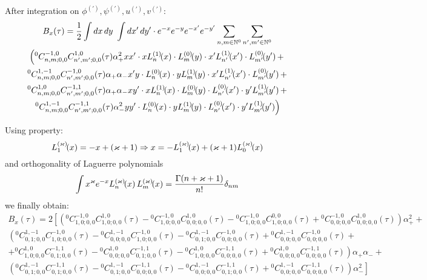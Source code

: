 \documentclass[12pt, notitlepage]{report}
\begin{document}
After integration on $\phi^{(')}, \psi^{(')}, u^{(')}, v^{(')}$:
\begin{multline}
	B_x(\tau) = \frac{1}{2} \int dx\, dy\ \int dx'\, dy' \cdot e^{-x}e^{-y}e^{-x'}e^{-y'}\sum\limits_{n,m\in \mathbb{N}^0}\sum\limits_{n',m'\in \mathbb{N}^0} \\
	\left( {}^0C^{-1, 0}_{n,m; 0, 0} C^{1, 0}_{n',m'; 0,0}(\tau)\alpha_+^2 xx' \cdot x\Lagg{n}{1}{x} \cdot \Lagg{m}{0}{y}\cdot x'\Lagg{n'}{1}{x'} \cdot \Lagg{m'}{0}{y'} + \right.\\
	\left. {}^0C^{1, -1}_{n,m; 0, 0} C^{-1, 0}_{n',m'; 0,0}(\tau)\alpha_+\alpha_- x'y \cdot \Lagg{n}{0}{x} \cdot y\Lagg{m}{1}{y}\cdot x'\Lagg{n'}{1}{x'} \cdot \Lagg{m'}{0}{y'} + \right.\\
	\left.  {}^0C^{1, 0}_{n,m; 0, 0} C^{-1, 1}_{n',m'; 0,0}(\tau)\alpha_+\alpha_- xy' \cdot x\Lagg{n}{1}{x} \cdot \Lagg{m}{0}{y}\cdot \Lagg{n'}{0}{x'} \cdot y'\Lagg{m'}{1}{y'} + \right.\\
	\left. {}^0C^{1, -1}_{n,m; 0, 0} C^{-1, 1}_{n',m'; 0,0}(\tau)\alpha_-^2 yy' \cdot \Lagg{n}{0}{x} \cdot y\Lagg{m}{1}{y}\cdot \Lagg{n'}{0}{x'} \cdot y'\Lagg{m'}{1}{y'} \right)
\end{multline}

Using property:
$$
L_{1}^{(\varkappa)}\!\!\left(x\right) = -x + (\varkappa+1) \Rightarrow x = -L_{1}^{(\varkappa)}\!\!\left(x\right) + (\varkappa+1)L_{0}^{(\varkappa)}\!\!\left(x\right)
$$
and orthogonality of Laguerre polynomials
$$
\int x^\varkappa e^{-x} L_{n}^{(\varkappa)}\!\!\left(x\right)L_{m}^{(\varkappa)}\!\!\left(x\right) = \frac{\Gamma(n+\varkappa+1)}{n!}\delta_{nm}
$$
we finally obtain:
\begin{multline}
	B_x(\tau) = 2 \left[ \left( {}^0C^{-1, 0}_{1,0; 0, 0} C^{1, 0}_{1,0; 0,0}(\tau) - {}^0C^{-1, 0}_{1,0; 0, 0} C^{1, 0}_{0,0; 0,0}(\tau) - {}^0C^{-1, 0}_{1,0; 0, 0} C^{0, 0}_{1,0; 0,0}(\tau) + {}^0C^{-1, 0}_{0,0; 0, 0} C^{1, 0}_{0,0; 0,0}(\tau) \right)\alpha_+^2  + \right.\\
	\left. \left( {}^0C^{1, -1}_{0,1; 0, 0} C^{-1, 0}_{1,0; 0,0}(\tau) - {}^0C^{1, -1}_{0,0; 0, 0} C^{-1, 0}_{1,0; 0,0}(\tau) - {}^0C^{1, -1}_{0,1; 0, 0} C^{-1, 0}_{0,0; 0,0}(\tau) + {}^0C^{1, -1}_{0,0; 0, 0} C^{-1, 0}_{0,0; 0,0}(\tau) + \right.\right. \\
	\left.\left. + {}^0C^{1, 0}_{1,0; 0, 0} C^{-1, 1}_{0,1; 0,0}(\tau) - {}^0C^{1, 0}_{0,0; 0, 0} C^{-1, 1}_{0,1; 0,0}(\tau) - {}^0C^{1, 0}_{1,0; 0, 0} C^{-1, 1}_{0,0; 0,0}(\tau) + {}^0C^{1, 0}_{0,0; 0, 0} C^{-1, 1}_{0,0; 0,0}(\tau) \right)\alpha_+\alpha_- + \right. \\
	\left. \left( {}^0C^{1, -1}_{0,1; 0, 0} C^{-1, 1}_{0,1; 0,0}(\tau) - {}^0C^{1, -1}_{0,1; 0, 0} C^{-1, 1}_{0,0; 0,0}(\tau) - {}^0C^{1, -1}_{0,0; 0, 0} C^{-1, 1}_{0,1; 0,0}(\tau) + {}^0C^{1, -1}_{0,0; 0, 0} C^{-1, 1}_{0,0; 0,0}(\tau) \right)\alpha_-^2 \right]
\end{multline}
\end{document}
